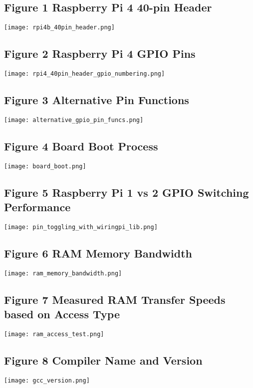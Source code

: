 \documentclass[journal]{IEEEtran}
\begin{document}
      \subsection{Figure 1 Raspberry Pi 4 40-pin Header}

      \texttt{[image: rpi4b\_40pin\_header.png]}

      \subsection{Figure 2 Raspberry Pi 4 GPIO Pins}

      \texttt{[image: rpi4\_40pin\_header\_gpio\_numbering.png]}

      \subsection{Figure 3 Alternative Pin Functions}

      \texttt{[image: alternative\_gpio\_pin\_funcs.png]}

      \subsection{Figure 4 Board Boot Process}

      \texttt{[image: board\_boot.png]}

      \subsection{Figure 5 Raspberry Pi 1 vs 2 GPIO Switching Performance}

      \texttt{[image: pin\_toggling\_with\_wiringpi\_lib.png]}

      \subsection{Figure 6 RAM Memory Bandwidth}

      \texttt{[image: ram\_memory\_bandwidth.png]}

      \subsection{Figure 7 Measured RAM Transfer Speeds based on Access Type}

      \texttt{[image: ram\_access\_test.png]}

      \subsection{Figure 8 Compiler Name and Version}

      \texttt{[image: gcc\_version.png]}
    
\end{document}
